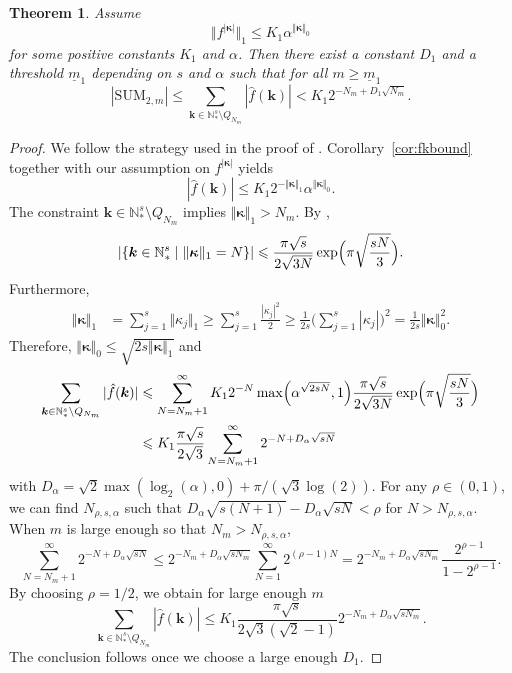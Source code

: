 \documentclass{article}
\newtheorem{theorem}{Theorem}
\theoremstyle{definition}
\renewcommand{\ge}{\geqslant}
\renewcommand{\leq}{\leqslant}
\renewcommand{\geq}{\geqslant}
\newcommand{\natu}{\mathbb{N}}
\newcommand{\bsk}{\boldsymbol{k}}
\newcommand{\bskappa}{\boldsymbol{\kappa}}
\begin{document}
\begin{theorem}\label{thm:sum2case1}
Assume 
$$\Vert f^{|\bskappa|}\Vert_1\leq K_1\alpha^{\Vert\bskappa\Vert_0}$$
for some positive constants $K_1$ and $\alpha$. Then there exist a constant $D_1$ and a threshold $\underline{m}_1$ depending on $s$ and $\alpha$ such that for all $m\geq \underline{m}_1$
    $$|\mathrm{SUM}_{2,m}|\leq \sum_{\bsk\in  \natu_*^s\setminus Q_{N_m}}|\hat{f}(\bsk)|< K_1 2^{-N_m+D_1 \sqrt{N_m}}.$$
\end{theorem}
\begin{proof}
We follow the strategy used in the proof of \cite[Theorem 2]{superpolymulti}. Corollary~\ref{cor:fkbound} together with our assumption on $f^{|\bskappa|}$ yields
    $$|\hat{f}(\bsk)|\leq K_1 2^{-\Vert\bskappa\Vert_1}\alpha^{\Vert\bskappa\Vert_0}.$$
    The constraint $\bsk\in  \natu_*^s\setminus Q_{N_m}$ implies $\Vert\bskappa\Vert_1>N_m$. By \cite[Theorem 7]{superpolymulti},
    $$|\{\bsk\in \natu_*^s\mid \Vert\bskappa\Vert_1=N\}|\leq \frac{\pi\sqrt{s}}{2\sqrt{3N}}\exp\Bigl(\pi\sqrt{\frac{sN}{3}}\Bigr).$$
    Furthermore, 
     \begin{align}\label{eqn:kappa1vs0}
 \Vert\bskappa\Vert_1&=\sum_{j=1}^s \Vert\kappa_j\Vert_1
    \ge
  \sum_{j=1}^s\frac{|\kappa_j|^2}{2}\geq
  \frac{1}{2s}\biggl(\sum_{j=1}^s|\kappa_j|\biggr)^2=\frac{1}{2s}\Vert\bskappa\Vert_0^2.
\end{align}
Therefore, $\Vert\bskappa\Vert_0\leq \sqrt{2s \Vert\bskappa\Vert_1}$ and
\begin{align*}
    \sum_{\bsk\in  \natu_*^s\setminus Q_{N_m}}|\hat{f}(\bsk)|&\leq \sum_{N=N_m+1}^\infty K_1 2^{-N}\max\Bigl(\alpha^{\sqrt{2s N}},1\Bigr)\frac{\pi\sqrt{s}}{2\sqrt{3N}}\exp\Bigl(\pi\sqrt{\frac{sN}{3}}\Bigr)\\
    &\leq K_1\frac{\pi\sqrt{s}}{2\sqrt{3}}\sum_{N=N_m+1}^\infty 2^{-N+D_\alpha\sqrt{sN}} 
\end{align*}
with $D_\alpha=\sqrt{2}\max(\log_2(\alpha),0)+\pi/(\sqrt{3}\log(2))$. For any $\rho\in (0,1)$, we can find $N_{\rho,s,\alpha}$ such that $D_\alpha\sqrt{s(N+1)}-D_\alpha\sqrt{sN}<\rho$ for $N>N_{\rho,s,\alpha}$. When $m$ is large enough so that $N_m>N_{\rho,s,\alpha}$,
$$\sum_{N=N_m+1}^\infty 2^{-N+D_\alpha\sqrt{sN}}\leq 2^{-N_m+D_\alpha\sqrt{sN_m}}\sum_{N=1}^\infty2^{(\rho-1)N}=2^{-N_m+D_\alpha\sqrt{sN_m}}\frac{2^{\rho-1}}{1-2^{\rho-1}}.$$
By choosing $\rho=1/2$, we obtain for large enough $m$
$$\sum_{\bsk\in  \natu_*^s\setminus Q_{N_m}}|\hat{f}(\bsk)|\leq K_1\frac{ \pi \sqrt{s}}{2\sqrt{3}(\sqrt{2}-1)} 2^{-N_m+D_\alpha\sqrt{sN_m}}.$$
The conclusion follows once we choose a large enough $D_1$.
\end{proof}
\end{document}
